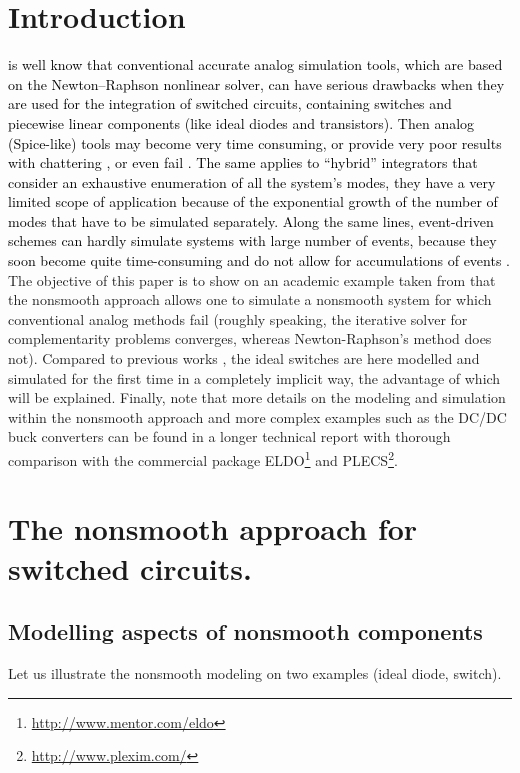 \section{Introduction}
\textcolor{black}{ is well know that conventional accurate analog simulation tools, which are based on the Newton--Raphson nonlinear solver, can have serious drawbacks when they are used for the integration of switched circuits, containing switches and piecewise linear components (like ideal diodes and transistors). Then analog ({\sc Spice}-like) tools  may become very time consuming, or provide very poor results with chattering \cite{galias2006}, or even fail \cite{maffezzoni2006,yuan2003,mayaram2000,chung1994,biolek2007}. The same applies to ``hybrid'' integrators that consider an exhaustive enumeration of all the system's modes, they have a very limited scope of application because of the exponential growth of the number of modes that have to be simulated separately. Along the same lines, event-driven schemes can hardly simulate systems with large number of events, because they soon become quite time-consuming and do not allow for accumulations of events \cite{acary-brogliato2008}.} The objective of this paper  is to show on an academic example taken from \cite{maffezzoni2006} that the nonsmooth approach allows one to simulate a nonsmooth system for which conventional analog methods fail (roughly speaking, the iterative solver for complementarity problems converges, whereas Newton-Raphson's method does not).  Compared to previous works \cite{glocker2005,vasca2009}, the ideal switches are here modelled and simulated for the first time in a completely implicit way, the advantage of which will be explained. Finally, note that more details on the modeling and simulation within the nonsmooth approach and more complex examples such as the DC/DC buck converters can be found in a longer technical report \cite{Acary.ea_RR2009} with thorough comparison with the commercial package ELDO\footnote{\url{http://www.mentor.com/eldo}} and PLECS\footnote{\url{http://www.plexim.com/}}.

\section{The nonsmooth approach for switched circuits.}
\label{section2}

\subsection{Modelling aspects of nonsmooth components}
\label{section21}
 Let us illustrate the nonsmooth modeling on two examples (ideal diode, switch).
 \renewcommand{\labelenumi}{\alph{enumi})}
